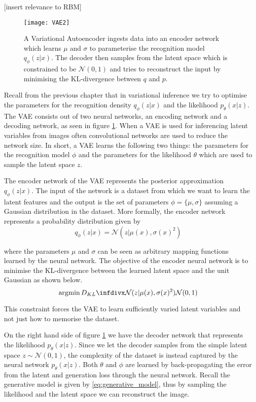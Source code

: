 \documentclass[main.tex]{subfiles}
\begin{document}
[insert relevance to RBM]

\begin{figure}[bt]
    \centering
    \texttt{[image: VAE2]}
    \caption{A Variational Autoencoder ingests data into an encoder network which learns $\mu$ and $\sigma$ to parameterise the recognition model $q_\phi(z|x)$. The decoder then samples from the latent space which is constrained to be $\mathcal{N}(0,1)$ and tries to reconstruct the input by minimising the KL-divergence between $q$ and $p$.}
    \label{fig:vae}
\end{figure}

Recall from the previous chapter that in variational inference we try to optimise the parameters for the recognition density $q_\phi(z|x)$ and the likelihood $p_\theta(x|z)$. The VAE consists out of two neural networks, an encoding network and a decoding network, as seen in figure \ref{fig:vae}. When a VAE is used for inferencing latent variables from images often convolutional networks are used to reduce the network size. In short, a VAE learns the following two things: the parameters for the recognition model $\phi$ and the parameters for the likelihood $\theta$ which are used to sample the latent space $z$.

The encoder network of the VAE represents the posterior approximation $q_\phi(z|x)$. The input of the network is a dataset from which we want to learn the latent features and the output is the set of parameters $\phi = \{\mu,\sigma\}$ assuming a Gaussian distribution in the dataset. More formally, the encoder network represents a probability distribution given by
\begin{equation}
  \label{eq:recognition_model}
  q_\phi(z|x) = \mathcal{N}(z|\mu(x), \sigma(x)^2)
\end{equation}
 
where the parameters $\mu$ and $\sigma$ can be seen as arbitrary mapping functions learned by the neural network. The objective of the encoder neural network is to minimise the KL-divergence between the learned latent space and the unit Gaussian as shown below.
\begin{equation}
  \argmin D_{KL}\infdiv{\mathcal{N}(z|\mu(x), \sigma(x)^2)}{\mathcal{N}(0,1)}
\end{equation}

This constraint forces the VAE to learn sufficiently varied latent variables and not just how to memorise the dataset.

On the right hand side of figure \ref{fig:vae} we have the decoder network that represents the likelihood $p_\theta(x|z)$. Since we let the decoder samples from the simple latent space $z \sim \mathcal{N}(0,1)$, the complexity of the dataset is instead captured by the neural network $p_\theta(x|z)$\cite{zhao2017towards}. Both $\theta$ and $\phi$ are learned by back-propagating the error from the latent and generation loss through the neural network. Recall the generative model is given by \eqref{eq:generative_model}, thus by sampling the likelihood and the latent space we can reconstruct the image.
\end{document}
